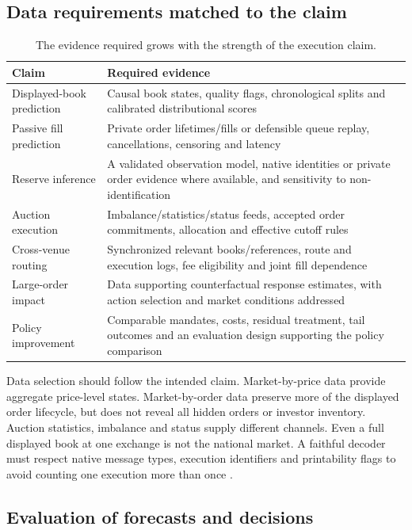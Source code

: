\documentclass[11pt]{article}
\numberwithin{equation}{section}
\theoremstyle{definition}
\theoremstyle{remark}
\theoremstyle{definition}
\begin{document}
\subsection{Data requirements matched to the claim}

\begin{table}[tb]
\centering\small
\caption{The evidence required grows with the strength of the execution claim.}\label{tab:evidence}
\begin{tabularx}{\textwidth}{YY}
\toprule Claim & Required evidence \\\midrule
Displayed-book prediction & Causal book states, quality flags, chronological splits and calibrated distributional scores \\
Passive fill prediction & Private order lifetimes/fills or defensible queue replay, cancellations, censoring and latency \\
Reserve inference & A validated observation model, native identities or private order evidence where available, and sensitivity to non-identification \\
Auction execution & Imbalance/statistics/status feeds, accepted order commitments, allocation and effective cutoff rules \\
Cross-venue routing & Synchronized relevant books/references, route and execution logs, fee eligibility and joint fill dependence \\
Large-order impact & Data supporting counterfactual response estimates, with action selection and market conditions addressed \\
Policy improvement & Comparable mandates, costs, residual treatment, tail outcomes and an evaluation design supporting the policy comparison \\
\bottomrule
\end{tabularx}
\end{table}

Data selection should follow the intended claim. Market-by-price data provide
aggregate price-level states. Market-by-order data preserve more of the
displayed order lifecycle, but does not reveal all hidden orders or investor
inventory. Auction statistics, imbalance and status supply different channels.
Even a full displayed book at one exchange is not the national market. A
faithful decoder must respect native message types, execution identifiers and
printability flags to avoid counting one execution more than once \citep{itch}.

\subsection{Evaluation of forecasts and decisions}
\end{document}
